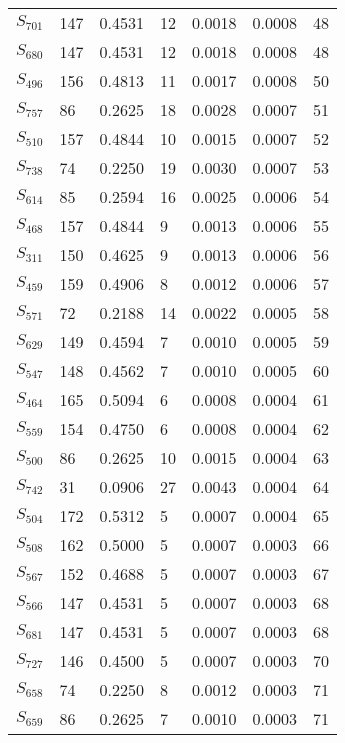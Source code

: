 \begin{xltabular}{\textwidth}{XXXXXXX}
  $S_{701}$ & 147 & 0.4531 & 12 & 0.0018 & 0.0008 & 48 \\ 
  $S_{680}$ & 147 & 0.4531 & 12 & 0.0018 & 0.0008 & 48 \\ 
  $S_{496}$ & 156 & 0.4813 & 11 & 0.0017 & 0.0008 & 50 \\ 
  $S_{757}$ & 86 & 0.2625 & 18 & 0.0028 & 0.0007 & 51 \\ 
  $S_{510}$ & 157 & 0.4844 & 10 & 0.0015 & 0.0007 & 52 \\ 
  $S_{738}$ & 74 & 0.2250 & 19 & 0.0030 & 0.0007 & 53 \\ 
  $S_{614}$ & 85 & 0.2594 & 16 & 0.0025 & 0.0006 & 54 \\ 
  $S_{468}$ & 157 & 0.4844 & 9 & 0.0013 & 0.0006 & 55 \\ 
  $S_{311}$ & 150 & 0.4625 & 9 & 0.0013 & 0.0006 & 56 \\ 
  $S_{459}$ & 159 & 0.4906 & 8 & 0.0012 & 0.0006 & 57 \\ 
  $S_{571}$ & 72 & 0.2188 & 14 & 0.0022 & 0.0005 & 58 \\ 
  $S_{629}$ & 149 & 0.4594 & 7 & 0.0010 & 0.0005 & 59 \\ 
  $S_{547}$ & 148 & 0.4562 & 7 & 0.0010 & 0.0005 & 60 \\ 
  $S_{464}$ & 165 & 0.5094 & 6 & 0.0008 & 0.0004 & 61 \\ 
  $S_{559}$ & 154 & 0.4750 & 6 & 0.0008 & 0.0004 & 62 \\ 
  $S_{500}$ & 86 & 0.2625 & 10 & 0.0015 & 0.0004 & 63 \\ 
  $S_{742}$ & 31 & 0.0906 & 27 & 0.0043 & 0.0004 & 64 \\ 
  $S_{504}$ & 172 & 0.5312 & 5 & 0.0007 & 0.0004 & 65 \\ 
  $S_{508}$ & 162 & 0.5000 & 5 & 0.0007 & 0.0003 & 66 \\ 
  $S_{567}$ & 152 & 0.4688 & 5 & 0.0007 & 0.0003 & 67 \\ 
  $S_{566}$ & 147 & 0.4531 & 5 & 0.0007 & 0.0003 & 68 \\ 
  $S_{681}$ & 147 & 0.4531 & 5 & 0.0007 & 0.0003 & 68 \\ 
  $S_{727}$ & 146 & 0.4500 & 5 & 0.0007 & 0.0003 & 70 \\ 
  $S_{658}$ & 74 & 0.2250 & 8 & 0.0012 & 0.0003 & 71 \\ 
  $S_{659}$ & 86 & 0.2625 & 7 & 0.0010 & 0.0003 & 71 \\ 

\end{xltabular}
